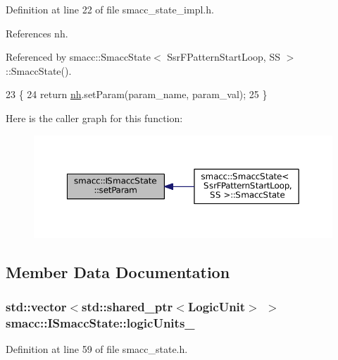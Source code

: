 Definition at line 22 of file smacc\+\_\+state\+\_\+impl.\+h.



References nh.



Referenced by smacc\+::\+Smacc\+State$<$ Ssr\+F\+Pattern\+Start\+Loop, S\+S $>$\+::\+Smacc\+State().


\begin{DoxyCode}
23 \{
24     \textcolor{keywordflow}{return} \hyperlink{classsmacc_1_1ISmaccState_a13fe6e6abfdb87996402189d44b78494}{nh}.setParam(param\_name, param\_val);
25 \}
\end{DoxyCode}


Here is the caller graph for this function\+:
\nopagebreak
\begin{figure}[H]
\begin{center}
\leavevmode
\includegraphics[width=350pt]{classsmacc_1_1ISmaccState_a0b6c531ca8c446052022308548f55b92_icgraph}
\end{center}
\end{figure}




\subsection{Member Data Documentation}
\subsubsection[{\texorpdfstring{logic\+Units\+\_\+}{logicUnits_}}]{\setlength{\rightskip}{0pt plus 5cm}std\+::vector$<$std\+::shared\+\_\+ptr$<${\bf Logic\+Unit}$>$ $>$ smacc\+::\+I\+Smacc\+State\+::logic\+Units\+\_\+}\hypertarget{classsmacc_1_1ISmaccState_a21bb2f9adba9c86e3d5306fd1db99fcd}{}\label{classsmacc_1_1ISmaccState_a21bb2f9adba9c86e3d5306fd1db99fcd}


Definition at line 59 of file smacc\+\_\+state.\+h.



